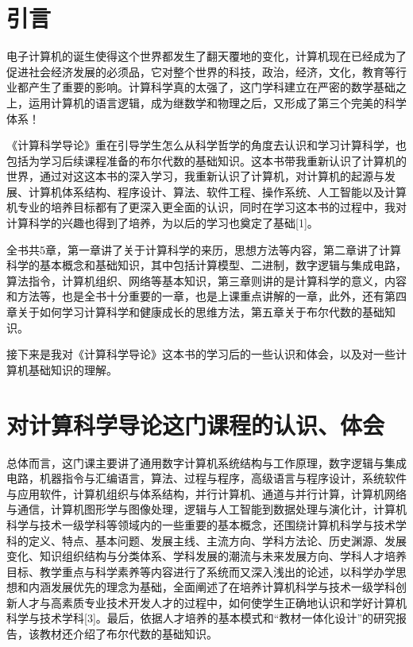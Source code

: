 \documentclass{article}
\begin{document}
\section{引言}
\par 电子计算机的诞生使得这个世界都发生了翻天覆地的变化，计算机现在已经成为了促进社会经济发展的必须品，它对整个世界的科技，政治，经济，文化，教育等行业都产生了重要的影响。计算科学真的太强了，这门学科建立在严密的数学基础之上，运用计算机的语言逻辑，成为继数学和物理之后，又形成了第三个完美的科学体系！\par
《计算科学导论》重在引导学生怎么从科学哲学的角度去认识和学习计算科学，也包括为学习后续课程准备的布尔代数的基础知识。这本书带我重新认识了计算机的世界，通过对这这本书的深入学习，我重新认识了计算机，对计算机的起源与发展、计算机体系结构、程序设计、算法、软件工程、操作系统、人工智能以及计算机专业的培养目标都有了更深入更全面的认识，同时在学习这本书的过程中，我对计算科学的兴趣也得到了培养，为以后的学习也奠定了基础[1]。 \par
全书共5章，第一章讲了关于计算科学的来历，思想方法等内容，第二章讲了计算科学的基本概念和基础知识，其中包括计算模型、二进制，数字逻辑与集成电路，算法指令，计算机组织、网络等基本知识，第三章则讲的是计算科学的意义，内容和方法等，也是全书十分重要的一章，也是上课重点讲解的一章，此外，还有第四章关于如何学习计算科学和健康成长的思维方法，第五章关于布尔代数的基础知识。\par
接下来是我对《计算科学导论》这本书的学习后的一些认识和体会，以及对一些计算机基础知识的理解。


\section{对计算科学导论这门课程的认识、体会}
\par 总体而言，这门课主要讲了通用数字计算机系统结构与工作原理，数字逻辑与集成电路，机器指令与汇编语言，算法、过程与程序，高级语言与程序设计，系统软件与应用软件，计算机组织与体系结构，并行计算机、通道与并行计算，计算机网络与通信，计算机图形学与图像处理，逻辑与人工智能到数据处理与演化计，计算机科学与技术一级学科等领域内的一些重要的基本概念，还围绕计算机科学与技术学科的定义、特点、基本问题、发展主线、主流方向、学科方法论、历史渊源、发展变化、知识组织结构与分类体系、学科发展的潮流与未来发展方向、学科人才培养目标、教学重点与科学素养等内容进行了系统而又深入浅出的论述，以科学办学思想和内涵发展优先的理念为基础，全面阐述了在培养计算机科学与技术一级学科创新人才与高素质专业技术开发人才的过程中，如何使学生正确地认识和学好计算机科学与技术学科[3]。最后，依据人才培养的基本模式和“教材一体化设计”的研究报告，该教材还介绍了布尔代数的基础知识。\par
\end{document}
